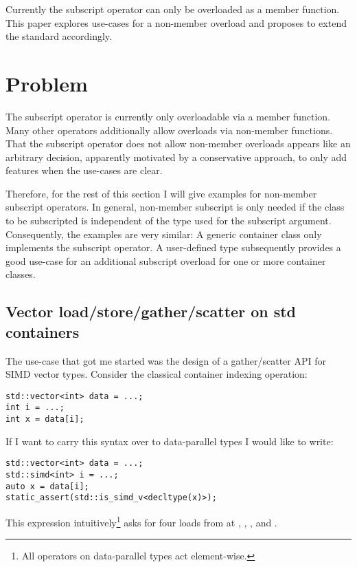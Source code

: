 \newcommand\wgTitle{Non-Member Subscript Operator}
\newcommand\wgName{Matthias Kretz <m.kretz@gsi.de>}
\newcommand\wgDocumentNumber{DXXXXR0}
\newcommand\wgGroup{EWG-I}
\newcommand\wgTarget{\CC{}23}

\usepackage{mymacros}
\usepackage{wg21}


\newlength\myIndent

\begin{wgTitlepage}
  Currently the subscript operator can only be overloaded as a member function.
  This paper explores use-cases for a non-member overload and proposes to extend
  the standard accordingly.
\end{wgTitlepage}

\section{Problem}
The subscript operator is currently only overloadable via a member function.
Many other operators additionally allow overloads via non\hyp member functions.
That the subscript operator does not allow non\hyp member overloads appears like an arbitrary decision, apparently motivated by a conservative approach, to only add features when the use\hyp cases are clear.

Therefore, for the rest of this section I will give examples for non\hyp member subscript operators.
In general, non\hyp member subscript is only needed if the class to be subscripted is independent of the type used for the subscript argument.
Consequently, the examples are very similar:
A generic container class only implements the  subscript operator.
A user-defined type subsequently provides a good use\hyp case for an additional subscript overload for one or more container classes.

\subsection{Vector load/store/gather/scatter on std containers}
The use\hyp case that got me started was the design of a gather/scatter API for SIMD vector types.
Consider the classical container indexing operation:
\smallskip\begin{lstlisting}
std::vector<int> data = ...;
int i = ...;
int x = data[i];
\end{lstlisting}
If I want to carry this syntax over to data\hyp parallel types I would like to write:
\smallskip\begin{lstlisting}
std::vector<int> data = ...;
std::simd<int> i = ...;
auto x = data[i];
static_assert(std::is_simd_v<decltype(x)>);
\end{lstlisting}
This expression intuitively\footnote{All operators on data-parallel types act element-wise.} asks for four loads from  at , , , and .

